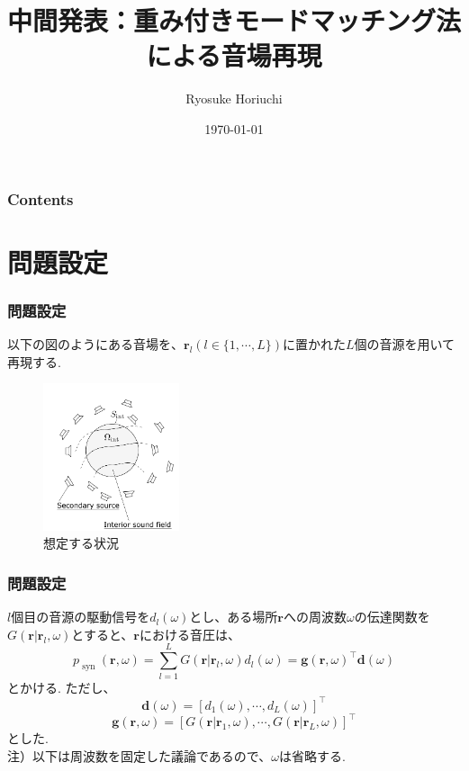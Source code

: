 \documentclass[uplatex,dvipdfmx,11pt,notheorems]{beamer}
\title[音場再現]{中間発表：重み付きモードマッチング法による音場再現}%
\author[Ryosuke Horiuchi]{Ryosuke Horiuchi}%
\institute[JPN]{Tokyo, Japan}%
\date{\today}%
\theoremstyle{definition}
\begin{document}
 \begin{frame}[plain]\frametitle{}
 \titlepage %
 \end{frame}

 \begin{frame}\frametitle{Contents}
 \tableofcontents %
 \end{frame}

 \section{問題設定}
 \begin{frame}\frametitle{問題設定}
 以下の図のようにある音場を、$\boldsymbol{r}_{l}(l \in\{1, \cdots, L\})$に置かれた$L$個の音源を用いて再現する.

    \begin{figure}[tb]
	\includegraphics[width=4cm,clip]{intersimu0.png}
	\caption{想定する状況}
	\end{figure}
 \end{frame}

  \begin{frame}\frametitle{問題設定}
 $l$個目の音源の駆動信号を$d_{l}(\omega)$とし、ある場所$\boldsymbol{r}$への周波数$\omega$の伝達関数を$G\left(\boldsymbol{r} | \boldsymbol{r}_{l}, \omega\right)$とすると、$\boldsymbol{r}$における音圧は、
 $$p_{\text { syn }}(\boldsymbol{r}, \omega)=\sum_{l=1}^{L}  G\left(\boldsymbol{r} | \boldsymbol{r}_{l}, \omega\right)d_{l}(\omega)=\boldsymbol{g}(\boldsymbol{r}, \omega)^{\top} \boldsymbol{d}(\omega)$$
 とかける.
 ただし、$$\boldsymbol{d}(\omega)=\left[d_{1}(\omega), \cdots, d_{L}(\omega)\right]^{\top}$$
 $$\boldsymbol{g}(\boldsymbol{r}, \omega)=\left[G\left(\boldsymbol{r} | \boldsymbol{r}_{1}, \omega\right), \cdots, G\left(\boldsymbol{r} | \boldsymbol{r}_{L}, \omega\right)\right]^{\top}$$
 とした.\\
 注）以下は周波数を固定した議論であるので、$\omega$は省略する.
 \end{frame}
\end{document}
